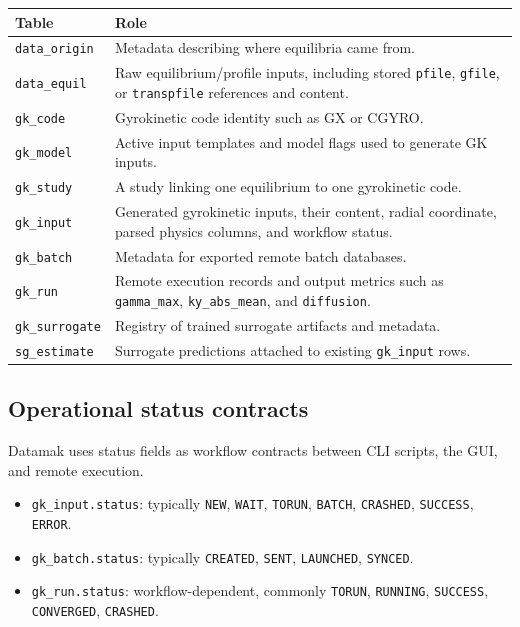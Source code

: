 \documentclass[11pt]{article}
\newcommand{\code}[1]{\texttt{#1}}
\begin{document}
\begin{longtable}{|>{\raggedright\arraybackslash}p{}|>{\raggedright\arraybackslash}p{}|}
\hline
\textbf{Table} & \textbf{Role} \\
\hline
\code{data\_origin} & Metadata describing where equilibria came from. \\
\hline
\code{data\_equil} & Raw equilibrium/profile inputs, including stored \code{pfile}, \code{gfile}, or \code{transpfile} references and content. \\
\hline
\code{gk\_code} & Gyrokinetic code identity such as GX or CGYRO. \\
\hline
\code{gk\_model} & Active input templates and model flags used to generate GK inputs. \\
\hline
\code{gk\_study} & A study linking one equilibrium to one gyrokinetic code. \\
\hline
\code{gk\_input} & Generated gyrokinetic inputs, their content, radial coordinate, parsed physics columns, and workflow status. \\
\hline
\code{gk\_batch} & Metadata for exported remote batch databases. \\
\hline
\code{gk\_run} & Remote execution records and output metrics such as \code{gamma\_max}, \code{ky\_abs\_mean}, and \code{diffusion}. \\
\hline
\code{gk\_surrogate} & Registry of trained surrogate artifacts and metadata. \\
\hline
\code{sg\_estimate} & Surrogate predictions attached to existing \code{gk\_input} rows. \\
\hline
\end{longtable}

\subsection{Operational status contracts}

Datamak uses status fields as workflow contracts between CLI scripts, the GUI,
and remote execution.

\begin{itemize}
\item \code{gk\_input.status}: typically \code{NEW}, \code{WAIT},
\code{TORUN}, \code{BATCH}, \code{CRASHED}, \code{SUCCESS}, \code{ERROR}.
\item \code{gk\_batch.status}: typically \code{CREATED}, \code{SENT},
\code{LAUNCHED}, \code{SYNCED}.
\item \code{gk\_run.status}: workflow-dependent, commonly \code{TORUN},
\code{RUNNING}, \code{SUCCESS}, \code{CONVERGED}, \code{CRASHED}.
\end{itemize}
\end{document}
